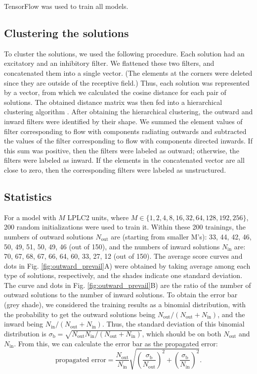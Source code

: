 \documentclass[pdftex,9pt,lineno]{elife}
\begin{document}
TensorFlow \citep{abadi2016tensorflow} was used to train all models.

\subsection{Clustering the solutions}
To cluster the solutions, we used the following procedure. Each solution had an excitatory and an inhibitory filter. We flattened these two filters, and concatenated them into a single vector. (The elements at the corners were deleted since they are outside of the receptive field.) Thus, each solution was represented by a vector, from which we calculated the cosine distance for each pair of solutions. The obtained distance matrix was then fed into a hierarchical clustering algorithm \citep{2020SciPy-NMeth}. After obtaining the hierarchical clustering, the outward and inward filters were identified by their shape. We summed the element values of filter corresponding to flow with components radiating outwards and subtracted the values of the filter corresponding to flow with components directed inwards. If this sum was positive, then the filters were labeled as outward; otherwise, the filters were labeled as inward. If the elements in the concatenated vector are all close to zero, then the corresponding filters were labeled as unstructured.

\subsection{Statistics}
For a model with $M$ LPLC2 units, where $M \in \{1,2,4,8,16,32,64,128,192,256\}$, 200 random initializations were used to train it. Within these 200 trainings, the numbers of outward solutions $N_{\text{out}}$ are (starting from smaller M's): 33, 44, 42, 46, 50, 49, 51, 50, 49, 46 (out of 150), and the numbers of inward solutions $N_{\text{in}}$ are: 70, 67, 68, 67, 66, 64, 60, 33, 27, 12 (out of 150). The average score curves and dots in Fig. \ref{fig:outward_prevail}A) were obtained by taking average among each type of solutions, respectively, and the shades indicate one standard deviation. The curve and dots in Fig. \ref{fig:outward_prevail}B) are the ratio of the number of outward solutions to the number of inward solutions. To obtain the error bar (grey shade), we considered the training results as a binomial distribution, with the probability to get the outward solutions being $N_{\text{out}}/(N_{\text{out}}+N_{\text{in}})$, and the inward being $N_{\text{in}}/(N_{\text{out}}+N_{\text{in}})$. Thus, the standard deviation of this binomial distribution is $\sigma_{\text{b}}=\sqrt{N_{\text{out}}N_{\text{in}}/(N_{\text{out}}+N_{\text{in}})}$, which should be on both $N_{\text{out}}$ and $N_{\text{in}}$. From this, we can calculate the error bar as the propagated error:
\begin{equation}
\text{propagated error} = \frac{N_{\text{out}}}{N_{\text{in}}}\sqrt{\left(\frac{\sigma_{\text{b}}}{N_{\text{out}}}\right)^{2}+\left(\frac{\sigma_{\text{b}}}{N_{\text{in}}}\right)^{2}}.
\end{equation}
\end{document}

